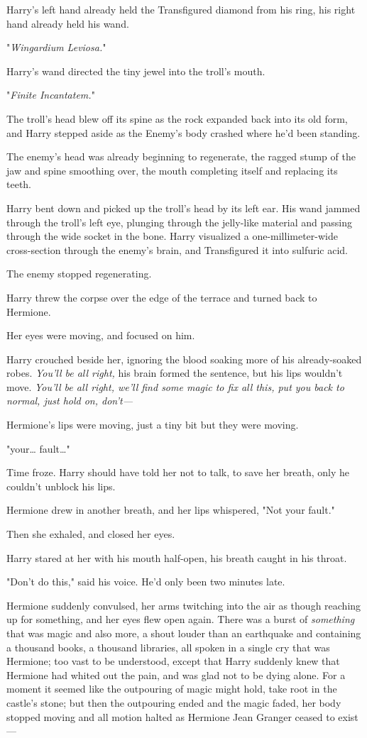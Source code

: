 Harry's left hand already held the Transfigured diamond from his ring, his
right hand already held his wand.

"\emph{Wingardium Leviosa.}"

Harry's wand directed the tiny jewel into the troll's mouth.

"\emph{Finite Incantatem.}"

The troll's head blew off its spine as the rock expanded back into its old
form, and Harry stepped aside as the Enemy's body crashed where he'd been
standing.

The enemy's head was already beginning to regenerate, the ragged stump of the
jaw and spine smoothing over, the mouth completing itself and replacing its
teeth.

Harry bent down and picked up the troll's head by its left ear. His wand jammed
through the troll's left eye, plunging through the jelly-like material and
passing through the wide socket in the bone. Harry visualized a
one-millimeter-wide cross-section through the enemy's brain, and Transfigured
it into sulfuric acid.

The enemy stopped regenerating.

Harry threw the corpse over the edge of the terrace and turned back to Hermione.

Her eyes were moving, and focused on him.

Harry crouched beside her, ignoring the blood soaking more of his
already-soaked robes. \emph{You'll be all right,} his brain formed the
sentence, but his lips wouldn't move. \emph{You'll be all right, we'll find
some magic to fix all this, put you back to normal, just hold on, don't---}

Hermione's lips were moving, just a tiny bit but they were moving.

"your{\ldots} fault{\ldots}"

Time froze. Harry should have told her not to talk, to save her breath, only he
couldn't unblock his lips.

Hermione drew in another breath, and her lips whispered, "Not your fault."

Then she exhaled, and closed her eyes.

Harry stared at her with his mouth half-open, his breath caught in his throat.

"Don't do this," said his voice. He'd only been two minutes late.

Hermione suddenly convulsed, her arms twitching into the air as though reaching
up for something, and her eyes flew open again. There was a burst of
\emph{something} that was magic and also more, a shout louder than an
earthquake and containing a thousand books, a thousand libraries, all spoken in
a single cry that was Hermione; too vast to be understood, except that Harry
suddenly knew that Hermione had whited out the pain, and was glad not to be
dying alone. For a moment it seemed like the outpouring of magic might hold,
take root in the castle's stone; but then the outpouring ended and the magic
faded, her body stopped moving and all motion halted as Hermione Jean Granger
ceased to exist---

